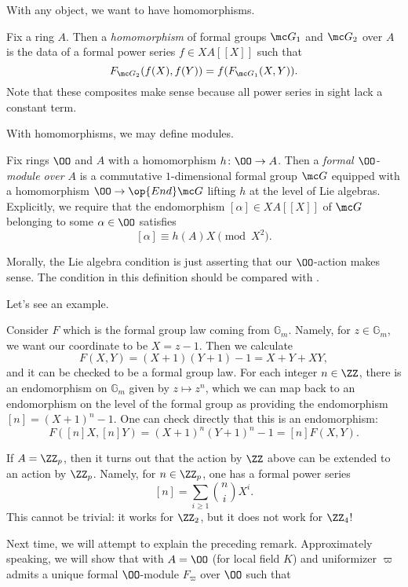 \documentclass[../notes.tex]{subfiles}
\begin{document}
With any object, we want to have homomorphisms.
\begin{defihelper}[homomorphism] 
	Fix a ring $A$. Then a \textit{homomorphism} of formal groups $\mc G_1$ and $\mc G_2$ over $A$ is the data of a formal power series $f\in XA[[X]]$ such that
	\[F_{\mc G_2}(f(X),f(Y))=f(F_{\mc G_1}(X,Y)).\]
	Note that these composites make sense because all power series in sight lack a constant term.
\end{defihelper}
With homomorphisms, we may define modules.
\begin{definition}
	Fix rings $\OO$ and $A$ with a homomorphism $h\colon\OO\to A$. Then a \textit{formal $\OO$-module over $A$} is a commutative $1$-dimensional formal group $\mc G$ equipped with a homomorphism $\OO\to\op{End}\mc G$ lifting $h$ at the level of Lie algebras. Explicitly, we require that the endomorphism $[\alpha]\in XA[[X]]$ of $\mc G$ belonging to some $\alpha\in\OO$ satisfies
	\[[\alpha]\equiv h(A)X\pmod{X^2}.\]
\end{definition}
\begin{remark}
	Morally, the Lie algebra condition is just asserting that our $\OO$-action makes sense. The condition in this definition should be compared with .
\end{remark}
Let's see an example.
\begin{example}
	Consider $F$ which is the formal group law coming from $\mathbb G_m$. Namely, for $z\in\mathbb G_m$, we want our coordinate to be $X=z-1$. Then we calculate
	\[F(X,Y)=(X+1)(Y+1)-1=X+Y+XY,\]
	and it can be checked to be a formal group law. For each integer $n\in\ZZ$, there is an endomorphism on $\mathbb G_m$ given by $z\mapsto z^n$, which we can map back to an endomorphism on the level of the formal group as providing the endomorphism $[n]=(X+1)^n-1$. One can check directly that this is an endomorphism:
	\[F([n]X,[n]Y)=(X+1)^n(Y+1)^n-1=[n]F(X,Y).\]
\end{example}
\begin{remark}
	If $A=\ZZ_p$, then it turns out that the action by $\ZZ$ above can be extended to an action by $\ZZ_p$. Namely, for $n\in\ZZ_p$, one has a formal power series
	\[[n]=\sum_{i\ge1}\binom niX^i.\]
	This cannot be trivial: it works for $\ZZ_2$, but it does not work for $\ZZ_4$!
\end{remark}
Next time, we will attempt to explain the preceding remark. Approximately speaking, we will show that with $A=\OO$ (for local field $K$) and uniformizer $\varpi$ admits a unique formal $\OO$-module $F_\varpi$ over $\OO$ such that
\end{document}
